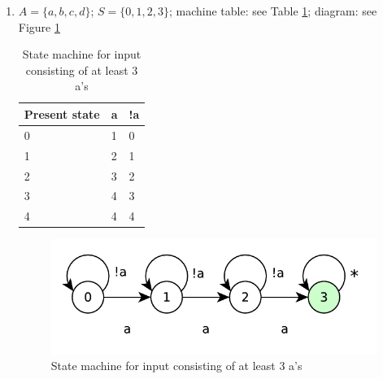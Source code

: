 \begin{enumerate}
    \item $A = \{a, b, c, d\}$; $S = \{0, 1, 2, 3\}$; machine table: see Table \ref{tab:machine-at-least-3as}; diagram: see Figure \ref{fig:atleast3as}
    \begin{table}[!ht]
        \centering
        \begin{tabular}{l|ll}
        Present state & a & !a \\ \hline
        0             & 1 & 0  \\
        1             & 2 & 1  \\
        2             & 3 & 2  \\
        3             & 4 & 3  \\
        4             & 4 & 4 
        \end{tabular}
        \caption{State machine for input consisting of at least 3 a's}
        \label{tab:machine-at-least-3as}
    \end{table}
    \begin{figure}[!ht]
        \centering
        \includegraphics[scale=0.5]{diagrams/atleast3as.pdf}
        \caption{State machine for input consisting of at least 3 a's}
        \label{fig:atleast3as}
    \end{figure}


\end{enumerate}
